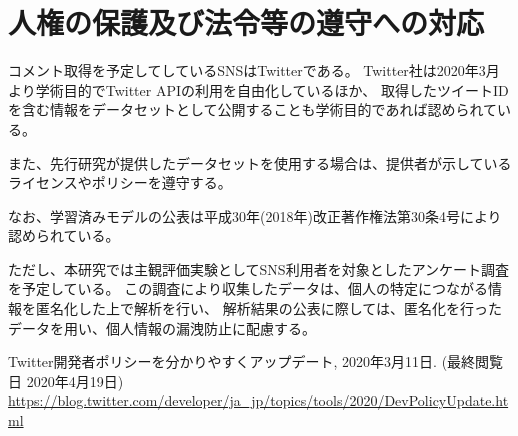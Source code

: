
\section{人権の保護及び法令等の遵守への対応}

コメント取得を予定してしているSNSはTwitterである。
Twitter社は2020年3月より学術目的でTwitter APIの利用を自由化しているほか、
取得したツイートIDを含む情報をデータセットとして公開することも学術目的であれば認められている\cite{twitter_2020}。

また、先行研究が提供したデータセットを使用する場合は、提供者が示しているライセンスやポリシーを遵守する。

なお、学習済みモデルの公表は平成30年(2018年)改正著作権法第30条4号により認められている。

ただし、本研究では主観評価実験としてSNS利用者を対象としたアンケート調査を予定している。
この調査により収集したデータは、個⼈の特定につながる情報を匿名化した上で解析を⾏い、
解析結果の公表に際しては、匿名化を⾏ったデータを⽤い、個⼈情報の漏洩防⽌に配慮する。

\vspace{1cm}
{\footnotesize
	\begin{thebibliography}{99}
		\setcounter{enumiv}{12}
		 Twitter開発者ポリシーを分かりやすくアップデート, 2020年3月11日. (最終閲覧日 2020年4月19日) \url{https://blog.twitter.com/developer/ja_jp/topics/tools/2020/DevPolicyUpdate.html}
	\end{thebibliography}
}



